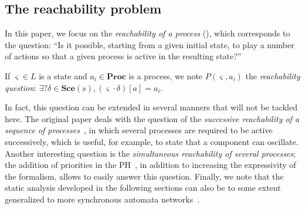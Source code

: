 \documentclass{movep}
\def\pref{\prettyref}
\newcommand{\PHl}{L}
\newcommand{\Proc}{\mathbf{Proc}}
\def\play{\cdot}
\def\Sce{\mathbf{Sce}}
\def\ctx{\varsigma}
\newcommand{\Pcai}{P(\ctx, a_i)}
\def\PHget#1#2{{#1[#2]}}
\def\ctx{\varsigma}
\newcounter{la}
\begin{document}
\subsection{The reachability problem}
\label{sec:reachability}


In this paper, we focus on the \emph{reachability of a process}
(\pref{def:reachability}),
which corresponds to the question:
“Is it possible, starting from a given initial state, to play a number of actions
so that a given process is active in the resulting state?”

\begin{definition}
\label{def:reachability}
  If $\ctx \in \PHl$ is a state and $a_i \in \Proc$ is a process,
  we note $\Pcai$ the \emph{reachability question}:
  $\exists? \delta \in \Sce(s), \PHget{(\ctx \play \delta)}{a} = a_i$.
\end{definition}

In fact, this question can be extended in several manners that will not be tackled here.
The original paper deals with the question of the
\emph{successive reachability of a sequence of processes}~\cite{PMR12-MSCS},
in which several processes are required to be active successively,
which is useful, for example, to state that a component can oscillate.
Another interesting question %
is the \emph{simultaneous reachability of several processes};
the addition of priorities in the PH~\cite{FPMR13-CS2Bio},
in addition to increasing the expressivity of the formalism,
allows to easily answer this question.
Finally, we note that the static analysis developed in the following sections
can also be to some extent generalized to more synchronous automata networks~\cite{PAK13-CAV}.
\end{document}
